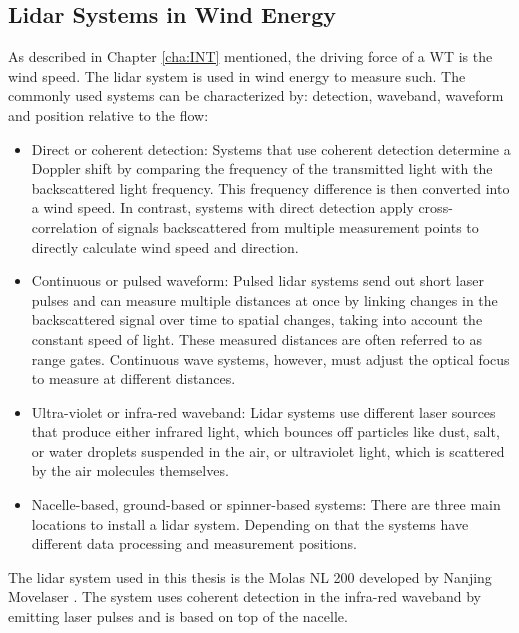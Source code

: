 \subsection{Lidar Systems in Wind Energy}\label{subsec:LidarInWind}
As described in Chapter \ref{cha:INT} mentioned, the driving force of a \gls{WT} is the wind speed. The \gls{lidar} system is used in wind energy to measure such. The commonly used systems can be characterized by: detection, waveband, waveform and position relative to the flow:

\begin{itemize}
	\item Direct or coherent detection: Systems that use coherent detection determine a Doppler shift by comparing the frequency of the transmitted light with the backscattered light frequency. This frequency difference is then converted into a wind speed. In contrast, systems with direct detection apply cross-correlation of signals backscattered from multiple measurement points to directly calculate wind speed and direction.
	
	\item Continuous or pulsed waveform: Pulsed lidar systems send out short laser pulses and can measure multiple distances at once by linking changes in the backscattered signal over time to spatial changes, taking into account the constant speed of light. These measured distances are often referred to as range gates. Continuous wave systems, however, must adjust the optical focus to measure at different distances.
	
	\item Ultra-violet or infra-red waveband: Lidar systems use different laser sources that produce either infrared light, which bounces off particles like dust, salt, or water droplets suspended in the air, or ultraviolet light, which is scattered by the air molecules themselves.
	
	\item Nacelle-based, ground-based or spinner-based systems: There are three main locations to install a \gls{lidar} system. Depending on that the systems have different data processing and measurement positions.
\end{itemize}
%
The \gls{lidar} system used in this thesis is the Molas NL 200 developed by Nanjing Movelaser \cite{MolasNL200}. The system uses coherent detection in the infra-red waveband by emitting laser pulses and is based on top of the nacelle.

